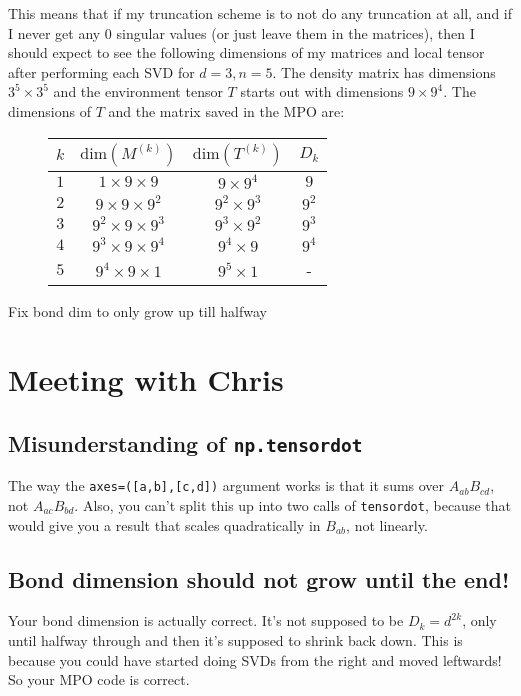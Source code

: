 \documentclass{report}
\begin{document}
This means that if my truncation scheme is to not do any truncation at all, and if I never get any 0 singular values (or just leave them in the matrices), then I should expect to see the following dimensions of my matrices and local tensor after performing each SVD for $d=3,n=5$. The density matrix has dimensions $3^5\times 3^5$ and the environment tensor $T$ starts out with dimensions $9\times 9^4$. The dimensions of $T$ and the matrix saved in the MPO are:\\
\begin{figure}[H]
\centering
\begin{tabular}{c|c|c|c}
$k$ & $\mathrm{dim}(M^{(k)})$ & $\mathrm{dim}(T^{(k)})$ & $D_k$\\
\hline
$1$ & $1\times 9\times 9$ & $9\times 9^4$ & $9$\\
\hline
$2$ & $9\times 9\times 9^2$ & $9^2\times 9^3$ & $9^2$\\
\hline
$3$ & $9^2\times 9\times 9^3$ & $9^3\times 9^2$ & $9^3$\\
\hline
$4$ & $9^3\times 9\times 9^4$ & $9^4\times 9$ & $9^4$\\
\hline
$5$ & $9^4\times 9\times 1$ & $9^5\times 1$ & -\\
\hline
\end{tabular}
\end{figure}	

\todo Fix bond dim to only grow up till halfway

\section{Meeting with Chris}

\subsection{Misunderstanding of \lstinline{np.tensordot}}

The way the \lstinline{axes=([a,b],[c,d])} argument works is that it sums over $A_{ab}B_{cd}$, not $A_{ac}B_{bd}$. Also, you can't split this up into two calls of \lstinline{tensordot}, because that would give you a result that scales quadratically in $B_{ab}$, not linearly.

\subsection{Bond dimension should not grow until the end!}

Your bond dimension is actually correct. It's not supposed to be $D_k=d^{2k}$, only until halfway through and then it's supposed to shrink back down. This is because you could have started doing SVDs from the right and moved leftwards! So your MPO code is correct.
\end{document}
